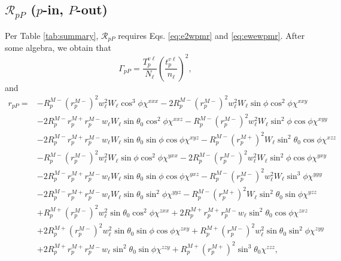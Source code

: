 
\subsection{\texorpdfstring{$\mathcal{R}_{pP}$ ($p$-in, $P$-out)}
{RpP (p-in, P-out)}}
\label{sec:RpP} 

Per Table \ref{tab:summary}, $\mathcal{R}_{pP}$ requires Eqs. \eqref{eq:e2wpmr}
and \eqref{eq:ewewpmr}. After some algebra, we obtain that
\begin{equation}\label{eq:mc78}
\Gamma_{pP} =
\frac{T^{v\ell}_{p}}{N_{\ell}}
\left(\frac{t^{v\ell}_{p}}{n_{\ell}}\right)^{2}
,
\end{equation}
and
\begin{equation}
\begin{split}
r_{pP} =
&-R^{M-}_{p}\left(r^{M-}_{p}\right)^{2}w^{2}_{\ell}W_{\ell}\cos^{3}\phi
\chi^{xxx}
 -2R^{M-}_{p}\left(r^{M-}_{p}\right)^{2}w^{2}_{\ell}W_{\ell}\sin\phi\cos^{2}\phi
\chi^{xxy}\\
&-2R^{M-}_{p}r^{M+}_{p}r^{M-}_{p}w_{\ell}W_{\ell}\sin\theta_{0}\cos^{2}\phi
\chi^{xxz}
 -R^{M-}_{p}\left(r^{M-}_{p}\right)^{2}w^{2}_{\ell}W_{\ell}\sin^{2}\phi\cos\phi
\chi^{xyy}\\
&-2R^{M-}_{p}r^{M+}_{p}r^{M-}_{p}w_{\ell}W_{\ell}\sin\theta_{0}\sin\phi\cos\phi
\chi^{xyz}
 -R^{M-}_{p}\left(r^{M+}_{p}\right)^{2}W_{\ell}\sin^{2}\theta_{0}\cos\phi
\chi^{xzz}\\
&-R^{M-}_{p}\left(r^{M-}_{p}\right)^{2}w^{2}_{\ell}W_{\ell}\sin\phi\cos^{2}\phi
\chi^{yxx}
 -2R^{M-}_{p}\left(r^{M-}_{p}\right)^{2}w^{2}_{\ell}W_{\ell}\sin^{2}\phi\cos\phi
\chi^{yxy}\\
&-2R^{M-}_{p}r^{M+}_{p}r^{M-}_{p}w_{\ell}W_{\ell}\sin\theta_{0}\sin\phi\cos\phi
\chi^{yxz}
 -R^{M-}_{p}\left(r^{M-}_{p}\right)^{2}w^{2}_{\ell}W_{\ell}\sin^{3}\phi
\chi^{yyy}\\
&-2R^{M-}_{p}r^{M+}_{p}r^{M-}_{p}w_{\ell}W_{\ell}\sin\theta_{0}\sin^{2}\phi
\chi^{yyz}
 -R^{M-}_{p}\left(r^{M+}_{p}\right)^{2}W_{\ell}\sin^{2}\theta_{0}\sin\phi
\chi^{yzz}\\
&+R^{M+}_{p}\left(r^{M-}_{p}\right)^{2}w^{2}_{\ell}\sin\theta_{0}\cos^{2}\phi
\chi^{zxx}
 +2R^{M+}_{p}r^{M+}_{p}r^{M-}_{p}w_{\ell}\sin^{2}\theta_{0}\cos\phi
\chi^{zxz}\\
&+2R^{M+}_{p}\left(r^{M-}_{p}\right)^{2}w^{2}_{\ell}\sin\theta_{0}\sin\phi
\cos\phi\chi^{zxy}
 +R^{M+}_{p}\left(r^{M-}_{p}\right)^{2}w^{2}_{\ell}\sin\theta_{0}\sin^{2}\phi
\chi^{zyy}\\
&+2R^{M+}_{p}r^{M+}_{p}r^{M-}_{p}w_{\ell}\sin^{2}\theta_{0}\sin\phi
\chi^{zzy}
 +R^{M+}_{p}\left(r^{M+}_{p}\right)^{2}\sin^{3}\theta_{0}
\chi^{zzz},
\end{split}
\end{equation}
